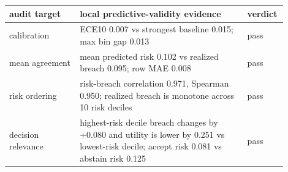\begin{tabular}{p{0.24\linewidth}p{0.58\linewidth}p{0.08\linewidth}}
\toprule
audit target & local predictive-validity evidence & verdict \\
\midrule
calibration & ECE10 0.007 vs strongest baseline 0.015; max bin gap 0.013 & pass \\
mean agreement & mean predicted risk 0.102 vs realized breach 0.095; row MAE 0.008 & pass \\
risk ordering & risk-breach correlation 0.971, Spearman 0.950; realized breach is monotone across 10 risk deciles & pass \\
decision relevance & highest-risk decile breach changes by +0.080 and utility is lower by 0.251 vs lowest-risk decile; accept risk 0.081 vs abstain risk 0.125 & pass \\
\bottomrule
\end{tabular}
